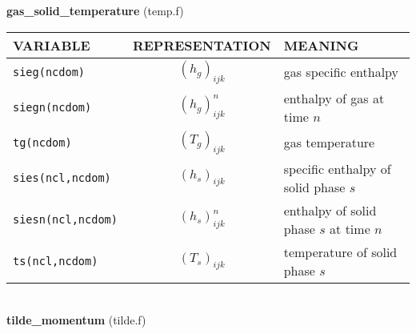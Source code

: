 %
%
{\large {\bf gas\_solid\_temperature}} (temp.f)\\[5mm]
\begin{tabular}{|p{6cm}|c|p{6cm}|}\hline
VARIABLE & REPRESENTATION & MEANING\\\hline
\tt sieg(ncdom) & $(h_g)_{ijk}$ &  gas specific enthalpy \\\hline 
\tt siegn(ncdom) & $(h_g)^{n}_{ijk}$ &  enthalpy of gas at time $n$\\\hline
\tt tg(ncdom) & $(T_g)_{ijk}$ &  gas temperature\\\hline
\tt sies(ncl,ncdom) & $(h_s)_{ijk}$ &  specific enthalpy of solid phase $s$ \\\hline
\tt siesn(ncl,ncdom) & $(h_s)^{n}_{ijk}$ &  enthalpy of solid phase $s$ at time $n$\\\hline
\tt ts(ncl,ncdom) & $(T_s)_{ijk}$ &  temperature of solid phase $s$\\\hline
\end{tabular}\\[5mm]
%
%
{\large{\bf tilde\_momentum}} (tilde.f)\\[5mm]
